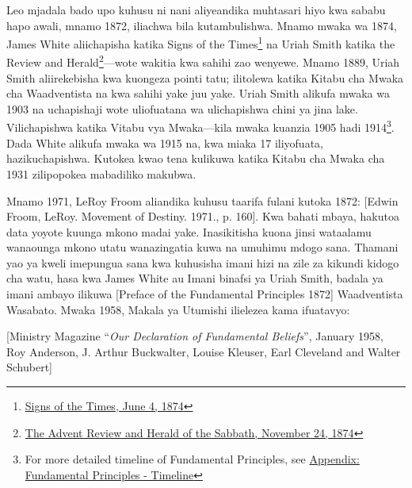 Leo mjadala bado upo kuhusu ni nani aliyeandika muhtasari hiyo kwa sababu hapo awali, mnamo 1872, iliachwa bila kutambulishwa. Mnamo mwaka wa 1874, James White aliichapisha katika Signs of the Times\footnote{\href{https://adventistdigitallibrary.org/adl-364148/signs-times-june-4-1874}{Signs of the Times, June 4, 1874}} na Uriah Smith katika the Review and Herald\footnote{\href{http://documents.adventistarchives.org/Periodicals/RH/RH18741124-V44-22.pdf}{The Advent Review and Herald of the Sabbath, November 24, 1874}}—wote wakitia kwa sahihi zao wenyewe. Mnamo 1889, Uriah Smith aliirekebisha kwa kuongeza pointi tatu; ilitolewa katika Kitabu cha Mwaka cha Waadventista na kwa sahihi yake juu yake. Uriah Smith alikufa mwaka wa 1903 na uchapishaji wote uliofuatana wa  ulichapishwa chini ya jina lake. Vilichapishwa katika Vitabu vya Mwaka—kila mwaka kuanzia 1905 hadi 1914\footnote{For more detailed timeline of Fundamental Principles, see \hyperref[appendix:timeline]{Appendix: Fundamental Principles - Timeline}}. Dada White alikufa mwaka wa 1915 na, kwa miaka 17 iliyofuata,  hazikuchapishwa. Kutokea kwao tena kulikuwa katika Kitabu cha Mwaka cha 1931 zilipopokea mabadiliko makubwa.


Mnamo 1971, LeRoy Froom aliandika kuhusu taarifa fulani kutoka 1872: [Edwin Froom, LeRoy. Movement of Destiny. 1971., p. 160]. Kwa bahati mbaya, hakutoa data yoyote kuunga mkono madai yake. Inasikitisha kuona jinsi wataalamu wanaounga mkono utatu wanazingatia  kuwa na umuhimu mdogo sana. Thamani yao ya kweli imepungua sana kwa kuhusisha imani hizi na zile za kikundi kidogo cha watu, hasa kwa James White au Imani binafsi ya Uriah Smith, badala ya imani ambayo ilikuwa [Preface of the Fundamental Principles 1872] Waadventista Wasabato. Mwaka 1958, Makala ya Utumishi ilielezea  kama ifuatavyo:


[Ministry Magazine “\textit{Our Declaration of Fundamental Beliefs}”, January 1958, Roy Anderson, J. Arthur Buckwalter, Louise Kleuser, Earl Cleveland and Walter Schubert]


